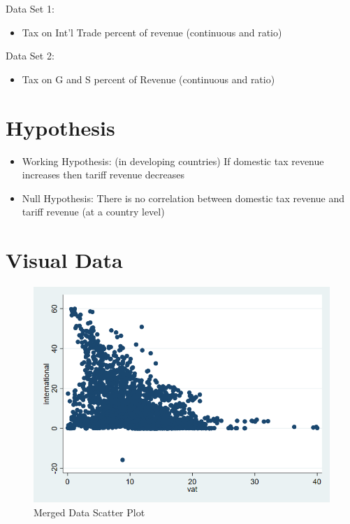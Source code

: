 \documentclass[12pt]{article}
\begin{document}
Data Set 1: 
\begin{itemize}
 \item Tax on Int'l Trade percent of revenue (continuous and ratio)
\end{itemize}
Data Set 2: 
\begin{itemize}
    \item Tax on G and S percent of Revenue (continuous and ratio)
\end{itemize}
\section{Hypothesis}
\begin{itemize}
    \item Working Hypothesis: (in developing countries) If domestic tax revenue increases then tariff revenue decreases
    \item Null Hypothesis: There is no correlation between domestic tax revenue and tariff revenue (at a country level)
\end{itemize}

\section{Visual Data}
\label{sec:graphs}


\begin{figure}
    \centering
    \includegraphics[width=0.5\linewidth]{mergedscatter.png}
    \caption{Merged Data Scatter Plot}
    \label{fig:enter-label}
\end{figure}
\end{document}
